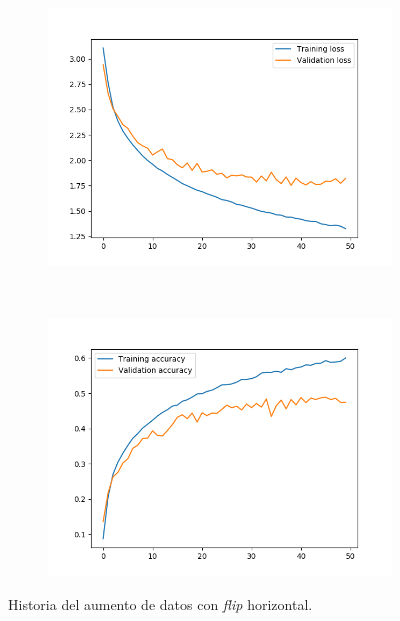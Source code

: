\documentclass[11pt,a4paper]{article}
\begin{document}
\begin{figure}[H]
  \centering
  \begin{subfigure}{.5\textwidth}
    \includegraphics[scale=0.4]{img/aug-flip-loss.png}
    \label{fig:aug-flip-loss}
  \end{subfigure}%
  ~ \quad
  \begin{subfigure}{.5\textwidth}
    \includegraphics[scale=0.4]{img/aug-flip-acc.png}
    \label{fig:aug-flip-acc}
  \end{subfigure}
  \caption{Historia del aumento de datos con \textit{flip} horizontal.}
  \label{fig:history-aug-flip}
\end{figure}
\end{document}
